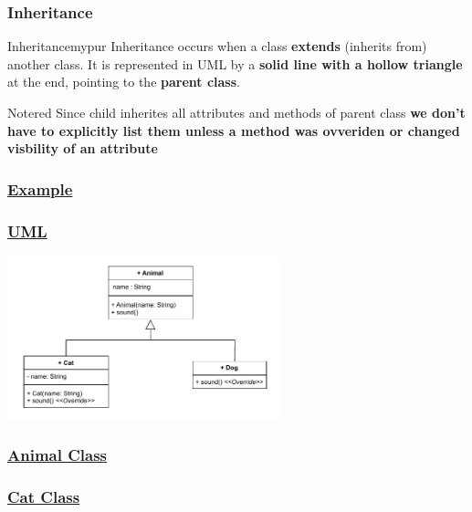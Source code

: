 \subsubsection*{Inheritance}

\begin{prettyBox}{Inheritance}{mypur}
Inheritance occurs when a class \textbf{extends} (inherits from) another class. It is represented in UML by a \textbf{solid line with a hollow triangle} at the end, pointing to the \textbf{parent class}.
\end{prettyBox}

\begin{prettyBox}{Note}{red}
Since child inherites all attributes and methods of parent class \textbf{we don't have to explicitly list them unless a method was ovveriden or changed visbility of an attribute}
\end{prettyBox}

\subsubsection*{\underline{Example}}

\subsubsection*{\underline{UML}}

\begin{center}
\includegraphics[width=0.6\textwidth]{Chapters/Diagram/OOP/EX4/ex4.drawio.pdf}
\end{center}


\subsubsection*{\underline{Animal Class}}


\subsubsection*{\underline{Cat Class}}


